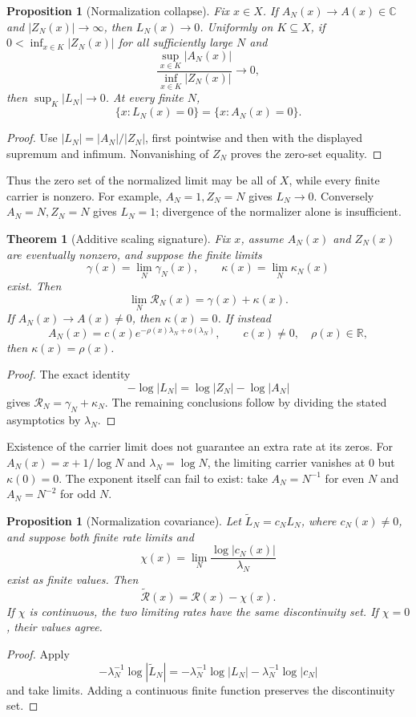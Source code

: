 \documentclass[11pt,a4paper]{article}
\theoremstyle{definition}
\theoremstyle{plain}
\newtheorem{proposition}[definition]{Proposition}
\newtheorem{theorem}[definition]{Theorem}
\theoremstyle{remark}
\begin{document}
\begin{proposition}[Normalization collapse]\label{prop:normcollapse}
Fix \(x\in X\).  If \(A_N(x)\to A(x)\in\mathbb C\) and
\(|Z_N(x)|\to\infty\), then \(L_N(x)\to0\).  Uniformly on \(K\subseteq X\),
if \(0<\inf_{x\in K}|Z_N(x)|\) for all sufficiently large \(N\) and
\[
 \frac{\sup_{x\in K}|A_N(x)|}
      {\inf_{x\in K}|Z_N(x)|}\longrightarrow0,
\]
then \(\sup_K|L_N|\to0\).  At every finite \(N\),
\[
 \{x:L_N(x)=0\}=\{x:A_N(x)=0\}.
\]
\end{proposition}
\begin{proof}
Use \(|L_N|=|A_N|/|Z_N|\), first pointwise and then with the displayed
supremum and infimum.  Nonvanishing of \(Z_N\) proves the zero-set equality.
\end{proof}

Thus the zero set of the normalized limit may be all of \(X\), while every
finite carrier is nonzero.  For example, \(A_N=1,Z_N=N\) gives
\(L_N\to0\).  Conversely \(A_N=N,Z_N=N\) gives \(L_N=1\); divergence of the
normalizer alone is insufficient.

\begin{theorem}[Additive scaling signature]\label{thm:rateadd}
Fix \(x\), assume \(A_N(x)\) and \(Z_N(x)\) are eventually nonzero, and
suppose the finite limits
\[
 \gamma(x)=\lim_N\gamma_N(x),\qquad
 \kappa(x)=\lim_N\kappa_N(x)
\]
exist.  Then
\[
 \lim_N\mathcal R_N(x)=\gamma(x)+\kappa(x).
\]
If \(A_N(x)\to A(x)\ne0\), then \(\kappa(x)=0\).  If instead
\[
 A_N(x)=c(x)e^{-\rho(x)\lambda_N+o(\lambda_N)},
 \qquad c(x)\ne0,\quad \rho(x)\in\mathbb R,
\]
then \(\kappa(x)=\rho(x)\).
\end{theorem}
\begin{proof}
The exact identity
\[
 -\log|L_N|=\log|Z_N|-\log|A_N|
\]
gives \(\mathcal R_N=\gamma_N+\kappa_N\).  The remaining conclusions follow
by dividing the stated asymptotics by \(\lambda_N\).
\end{proof}

Existence of the carrier limit does not guarantee an extra rate at its zeros.
For \(A_N(x)=x+1/\log N\) and \(\lambda_N=\log N\), the limiting carrier
vanishes at \(0\) but \(\kappa(0)=0\).  The exponent itself can fail to exist:
take \(A_N=N^{-1}\) for even \(N\) and \(A_N=N^{-2}\) for odd \(N\).

\begin{proposition}[Normalization covariance]\label{prop:normcovariance}
Let \(\widetilde L_N=c_NL_N\), where \(c_N(x)\ne0\), and suppose both finite
rate limits and
\[
 \chi(x)=\lim_N\frac{\log|c_N(x)|}{\lambda_N}
\]
exist as finite values.  Then
\[
 \widetilde{\mathcal R}(x)=\mathcal R(x)-\chi(x).
\]
If \(\chi\) is continuous, the two limiting rates have the same discontinuity
set.  If \(\chi=0\), their values agree.
\end{proposition}
\begin{proof}
Apply
\[
 -\lambda_N^{-1}\log|\widetilde L_N|
 =
 -\lambda_N^{-1}\log|L_N|
 -\lambda_N^{-1}\log|c_N|
\]
and take limits.  Adding a continuous finite function preserves the
discontinuity set.
\end{proof}
\end{document}

